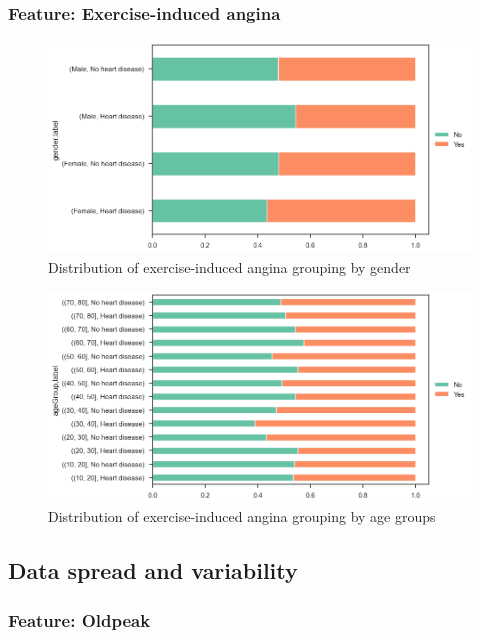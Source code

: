 \subsubsection{Feature: Exercise-induced angina}

\begin{figure}
    \caption{Distribution of exercise-induced angina grouping by gender}\label{frequency-exerciseangina-gender-percent}
    \centering
    \includegraphics[width=\linewidth]{media/frequency-11-gender-exerciseangina.png}
\end{figure}

\begin{figure}
    \caption{Distribution of exercise-induced angina grouping by age groups}\label{frequency-exerciseangina-agegroup-percent}
    \centering
    \includegraphics[width=\linewidth]{media/frequency-12-agegroup-exerciseangina.png}
\end{figure}

\subsection{Data spread and variability}

\subsubsection{Feature: Oldpeak}

